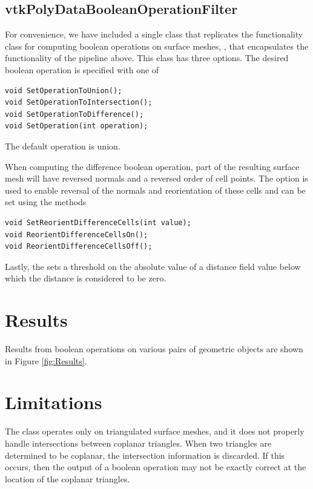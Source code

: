 \documentclass{InsightArticle}
\begin{document}
\subsection{vtkPolyDataBooleanOperationFilter}

For convenience, we have included a single class that replicates the functionality  class for computing boolean operations on surface meshes, , that encapsulates the functionality of the pipeline above. This class has three options. The desired boolean operation is specified with one of
\begin{verbatim}
void SetOperationToUnion();
void SetOperationToIntersection();
void SetOperationToDifference();
void SetOperation(int operation);
\end{verbatim}
The default operation is union.

When computing the difference boolean operation, part of the resulting surface mesh will have reversed normals and a reversed order of cell points. The  option is used to enable reversal of the normals and reorientation of these cells and can be set using the methods
\begin{verbatim}
void SetReorientDifferenceCells(int value);
void ReorientDifferenceCellsOn();
void ReorientDifferenceCellsOff();
\end{verbatim} 

Lastly, the  sets a threshold on the absolute value of a distance field value below which the distance is considered to be zero.
\section{Results}

Results from boolean operations on various pairs of geometric objects are shown in Figure \ref{fig:Results}.



\section{Limitations}

The  class operates only on triangulated surface meshes, and it does not properly handle intersections between coplanar triangles. When two triangles are determined to be coplanar, the intersection information is discarded. If this occurs, then the output of a boolean operation may not be exactly correct at the location of the coplanar triangles.
\end{document}
